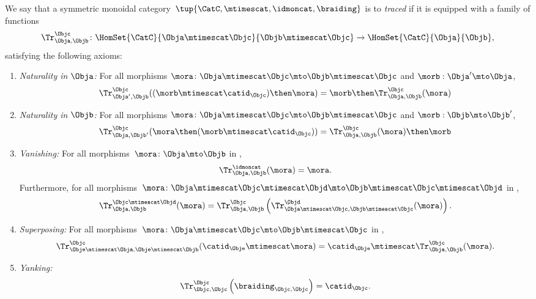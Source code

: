\begin{ctdefinition}
	\label{def:traced-monoidal-cat}
	\label{def:traced-monoidal-category}
	We say that a symmetric monoidal category~$\tup{\CatC,\mtimescat,\idmoncat, \braiding}$ is to \emph{traced} if it is equipped with a family of functions
	\begin{equation}
		\Tr_{\Obja,\Objb}^\Objc\colon \HomSet{\CatC}{\Obja \mtimescat \Objc}{\Objb\mtimescat \Objc}\to \HomSet{\CatC}{\Obja}{\Objb},
	\end{equation}
	satisfying the following axioms:
	\begin{enumerate}
		\item \emph{Naturality in $\Obja$:} For all morphisms $\mora\colon \Obja\mtimescat \Objc \mto \Objb\mtimescat \Objc$ and $\morb : \Obja' \mto \Obja$,
		      \begin{equation}
			      \Tr_{\Obja', \Objb}^\Objc ( (\morb \mtimescat \catid_\Objc) \then \mora) = \morb \then \Tr_{\Obja, \Objb}^\Objc (\mora)
		      \end{equation}
		\item \emph{Naturality in $\Objb$:} For all morphisms $\mora\colon \Obja\mtimescat \Objc \mto \Objb\mtimescat \Objc$ and $\morb : \Objb \mto \Objb'$,
		      \begin{equation}
			      \Tr_{\Obja, \Objb'}^\Objc ( \mora \then (\morb \mtimescat \catid_\Objc) ) =  \Tr_{\Obja, \Objb}^\Objc (\mora) \then \morb
		      \end{equation}
		\item \emph{Vanishing:} For all morphisms~$\mora \colon \Obja\mto \Objb$ in \CatC,
		      \begin{equation}
			      \label{eq:vanishing_1}
			      \Tr_{\Obja,\Objb}^\idmoncat (\mora)=\mora.
		      \end{equation}
		      Furthermore, for all morphisms~$\mora \colon \Obja\mtimescat \Objc \mtimescat \Objd \mto \Objb\mtimescat \Objc \mtimescat \Objd$ in \CatC,
		      \begin{equation}
			      \label{eq:vanishing_2}
			      \Tr_{\Obja,\Objb}^{\Objc\mtimescat \Objd}(\mora)=\Tr_{\Obja,\Objb}^\Objc\left(
			      \Tr_{\Obja \mtimescat \Objc , \Objb \mtimescat \Objc}^\Objd(\mora)\right).
		      \end{equation}
		\item \emph{Superposing:}
		      For all morphisms~$\mora\colon \Obja\mtimescat \Objc \mto \Objb\mtimescat \Objc$ in \CatC,
		      \begin{equation}
			      \label{eq:superposing}
			      \Tr_{\Obje\mtimescat \Obja,\Obje\mtimescat \Objb}^{\Objc}(\catid_\Obje\mtimescat \mora)=\catid_\Obje\mtimescat \Tr_{\Obja,\Objb}^\Objc(\mora).
		      \end{equation}
		\item \emph{Yanking:}
		      \begin{equation}
			      \label{eq:yanking}
			      \Tr_{\Objc,\Objc}^\Objc\left(\braiding_{\Objc,\Objc}\right)=\catid_\Objc.
		      \end{equation}
	\end{enumerate}
\end{ctdefinition}

